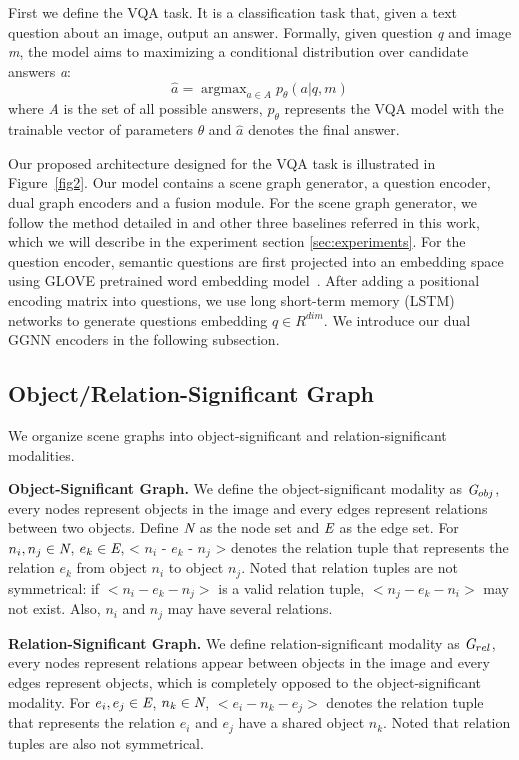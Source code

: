 \documentclass[letterpaper]{article} %
\begin{document}
First we define the VQA task. It is a classification task that, given a text question about an image, output an answer. 
Formally, given question \emph{q} and image \emph{m}, the model aims to maximizing a conditional distribution over candidate answers \emph{a}:
\begin{equation}
    \hat{a} = \mathop{\arg\max}_{a \in A}p_\theta(a|q, m)
\end{equation}
where \emph{A} is the set of all possible answers, $p_\theta$ represents the VQA model with the trainable vector of parameters $\theta$ and $\hat{a}$ denotes the final answer.

Our proposed architecture designed for the VQA task is illustrated in Figure~\ref{fig2}. 
Our model contains a scene graph generator, a question encoder, dual graph encoders and a fusion module. For the scene graph generator, we follow the method detailed in \cite{tang2020sggcode} and other three baselines referred in this work, which we will describe in the experiment section \ref{sec:experiments}. 
For the question encoder, semantic questions are first projected into an embedding space using GLOVE pretrained word embedding model~\cite{pennington-etal-2014-glove}. 
After adding a positional encoding matrix into questions, we use long short-term memory (LSTM) networks to generate questions embedding $q \in R^{dim}$. 
We introduce our dual GGNN encoders in the following subsection.

\subsection{Object/Relation-Significant Graph}
We organize scene graphs into object-significant and relation-significant modalities. 

\medskip
\textbf{Object-Significant Graph.} We define the object-significant modality as $\emph{G}_{obj}$, every nodes represent objects in the image and every edges represent relations between two objects. Define $\emph{N}$ as the node set and $\emph{E}$ as the edge set. For $n_i, n_j \in \emph{N}$, $e_k \in \emph{E}$, < $n_i$ - $e_k$ - $n_j$ > denotes the relation tuple that represents the relation $e_k$ from object $n_i$ to object $n_j$. Noted that relation tuples are not symmetrical: if $<n_i - e_k - n_j>$ is a valid relation tuple,  $<n_j - e_k - n_i>$ may not exist. Also, $n_i$ and $n_j$ may have several relations. 

\medskip
\textbf{Relation-Significant Graph.} We define relation-significant modality as $\emph{G}_{rel}$, every nodes represent relations appear between objects in the image and every edges represent objects, which is completely opposed to the object-significant modality. For $e_i, e_j \in \emph{E}$, $n_k \in \emph{N}$, $<e_i - n_k - e_j>$ denotes the relation tuple that represents the relation $e_i$ and $e_j$ have a shared object $n_k$. Noted that relation tuples are also not symmetrical.
\end{document}
